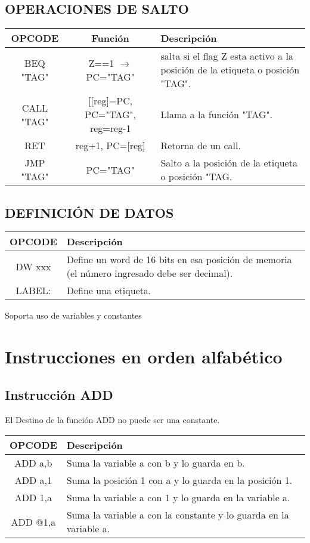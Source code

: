 \documentclass[12pt]{article}
\begin{document}
\subsection{OPERACIONES DE SALTO}

\begin{tabular}{| c | c |p{5cm}|}
\hline 
OPCODE & Funci\'on & Descripci\'on \\ \hline
BEQ "TAG" & Z==1 $\rightarrow$ PC="TAG" & salta si el flag Z esta activo a la posici\'on de la etiqueta o posici\'on "TAG".\\ \hline
CALL "TAG" &  [[reg]=PC, PC="TAG", reg=reg-1   & Llama a la funci\'on "TAG".\\  \hline
RET & reg+1, PC=[reg]   & Retorna de un call. \\ \hline
JMP "TAG" & PC="TAG" & Salto a la posici\'on de la etiqueta o posici\'on "TAG.\\  \hline
\end{tabular}

\subsection{DEFINICI\'ON DE DATOS}
\begin{tabular}{| c | p{11.5cm}|}
\hline 
OPCODE & Descripci\'on  \\ \hline
DW xxx &  Define un word de 16 bits en esa posici\'on de memoria (el n\'umero ingresado debe ser decimal).\\ \hline
LABEL: &  Define una etiqueta.\\  \hline
\end{tabular}


Soporta uso de variables y constantes

\section{Instrucciones en orden alfab\'etico}

\subsection{Instrucci\'on ADD}
El Destino de la funci\'on ADD no puede ser una constante.\\
\begin{tabular}{| c | p{11.5cm}|}
\hline 
OPCODE & Descripci\'on  \\ \hline
ADD a,b & Suma la variable a con b y lo guarda en b.\\ \hline
ADD a,1 & Suma la posici\'on 1 con a y lo guarda en la posici\'on 1.\\ \hline
ADD 1,a & Suma la variable a con 1 y lo guarda en la variable a.\\ \hline
ADD @1,a & Suma la variable a con la constante y lo guarda en la variable a.\\ \hline
\end{tabular}
\end{document}
